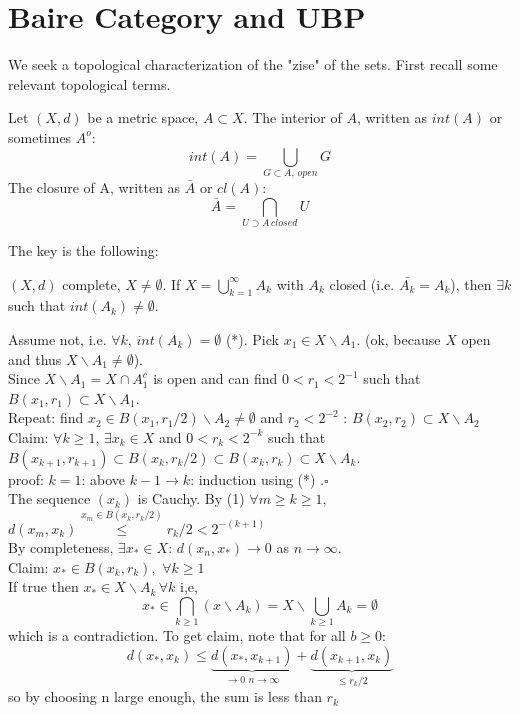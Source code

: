 \newpage
\section{Baire Category and UBP}
We seek a topological characterization of the "zise" of the sets. First recall some relevant topological terms.
\begin{definition}\rm\nextline
    Let $(X,d)$ be a metric space, $A\subset X$.
    The interior of $A$, written as $int(A)$ or sometimes $A^o$:
    $$ int(A)=\bigcup_{G\subset A,\,open}G$$
    The closure of A, written as $\bar{A}$ or $cl(A)$:
    $$ \bar{A}=\bigcap_{U\supset A\,closed}U$$

\end{definition}
The key is the following:
\begin{lemma}\rm\nextline
    $(X,d)$ complete, $X\neq\emptyset$. If $X=\bigcup_{k=1}^\infty A_k$ with $A_k$ closed (i.e. $\bar{A_k}=A_k$), then $\exists k$ such that $int(A_k)\neq\emptyset$.
    \begin{pf}{}{}
        Assume not, i.e. $\forall k,\,int(A_k)=\emptyset$ (*). Pick $x_1\in X\backslash A_1$. (ok, because $X$ open and thus $X\backslash A_1\neq\emptyset$).\\
        Since $X\backslash A_1=X\cap A_1^c$ is open and can find $0<r_1<2^{-1}$ such that $B(x_1,r_1)\subset X\backslash A_1$.\\
        Repeat: find $x_2\in B(x_1,r_1/2)\backslash A_2\neq\emptyset$ and $r_2<2^{-2}$ : $B(x_2,r_2)\subset X\backslash A_2$\\
        Claim: $\forall k\geq 1$, $\exists x_k\in X$ and $0<r_k<2^{-k}$ such that $B(x_{k+1},r_{k+1})\subset B(x_k,r_k/2)\subset B(x_k,r_k)\subset X\backslash A_k$.\\
        proof: $k=1$: above $k-1\rightarrow k$: induction using (*) .$\square$\\
        The sequence $(x_k)$ is Cauchy. By (1) $\forall m\geq k\geq1$, $d(x_m,x_k)\stackrel{x_m\in B(x_k,r_k/2)}{\leq}r_k/2<2^{-(k+1)}$\\
        By completeness, $\exists x_*\in X$: $d(x_n,x_*)\to0$ as $n\to \infty$.\\
        Claim: $x_*\in B(x_k,r_k),\,\,\forall k\geq 1$\\
        If true then $x_*\in X\backslash A_k\,\forall k$ i,e, 
        $$x_*\in\bigcap_{k\geq1}(x\backslash A_k)=X\backslash\bigcup_{k\geq1}A_k=\emptyset$$
        which is a contradiction. To get claim, note that for all $b\geq0$:
        $$
        d(x_*,x_k)\leq \underbrace{{d(x_*,x_{k+1})}}_{\to0\,\,n\to\infty}+\underbrace{d(x_{k+1},x_k)}_{\leq r_k/2}
        $$
        so by choosing n large enough, the sum is less than $r_k$
    \end{pf}
\end{lemma}